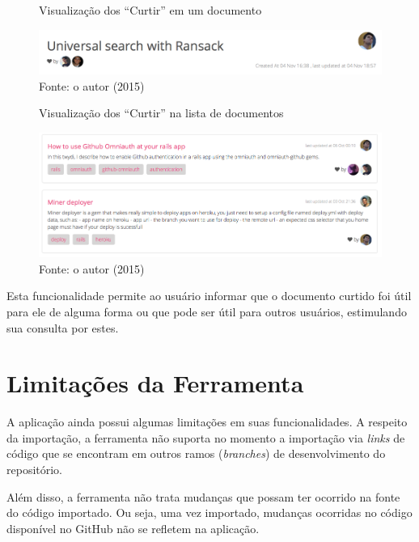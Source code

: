\begin{figure}[h]
	\centering
    \caption{Visualização dos ``Curtir'' em um documento}
    \includegraphics[width=15cm]{Imagens/print-like-1.png}
	\caption*{Fonte: o autor (2015)}
\end{figure}

\begin{figure}[h]
	\centering
    \caption{Visualização dos ``Curtir'' na lista de documentos}
    \includegraphics[width=15cm]{Imagens/print-like-2.png}
	\caption*{Fonte: o autor (2015)}
\end{figure}


Esta funcionalidade permite ao usuário informar que o documento curtido foi útil para ele de alguma forma ou que pode ser útil para outros usuários, estimulando sua consulta por estes.

\section{Limitações da Ferramenta}

A aplicação ainda possui algumas limitações em suas funcionalidades. A respeito da importação, a ferramenta não suporta no momento a importação via \textit{links} de código que se encontram em outros ramos (\textit{branches}) de desenvolvimento do repositório.

Além disso, a ferramenta não trata mudanças que possam ter ocorrido na fonte do código importado. Ou seja, uma vez importado, mudanças ocorridas no código disponível no GitHub não se refletem na aplicação.

